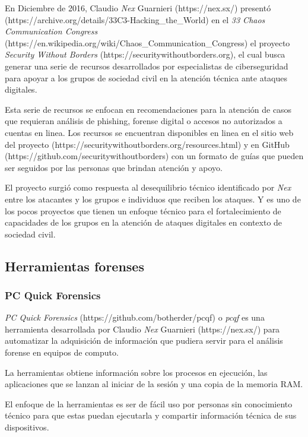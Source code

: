 \documentclass[12pt]{caltech_thesis}
\begin{document}
En Diciembre de 2016, Claudio \textit{Nex} Guarnieri (https://nex.sx/) presentó (https://archive.org/details/33C3-Hacking\_the\_World) en el \textit{33 Chaos Communication Congress} (https://en.wikipedia.org/wiki/Chaos\_Communication\_Congress) el proyecto \textit{Security Without Borders} (https://securitywithoutborders.org), el cual busca generar una serie de recursos desarrollados por especialistas de ciberseguridad para apoyar a los grupos de sociedad civil en la atención técnica ante ataques digitales.

Esta serie de recursos se enfocan en recomendaciones para la atención de casos que requieran análisis de phishing, forense digital o accesos no autorizados a cuentas en linea. Los recursos se encuentran disponibles en linea en el sitio web del proyecto (https://securitywithoutborders.org/resources.html) y en GitHub (https://github.com/securitywithoutborders) con un formato de guías que pueden ser seguidos por las personas que brindan atención y apoyo.

El proyecto surgió como respuesta al desequilibrio técnico identificado por \textit{Nex} entre los atacantes y los grupos e individuos que reciben los ataques. Y es uno de los pocos proyectos que tienen un enfoque técnico para el fortalecimiento de capacidades de los grupos en la atención de ataques digitales en contexto de sociedad civil.

\subsection{Herramientas forenses}

\subsubsection{PC Quick Forensics}

\textit{PC Quick Forensics} (https://github.com/botherder/pcqf) o \textit{pcqf} es una herramienta desarrollada por Claudio \textit{Nex} Guarnieri (https://nex.sx/) para automatizar la adquisición de información que pudiera servir para el análisis forense en equipos de computo.

La herramientas obtiene información sobre los procesos en ejecución, las aplicaciones que se lanzan al iniciar de la sesión y una copia de la memoria RAM. 

El enfoque de la herramientas es ser de fácil uso por personas sin conocimiento técnico para que estas puedan ejecutarla y compartir información técnica de sus dispositivos.
\end{document}
